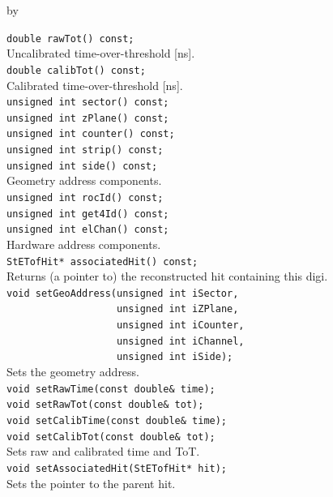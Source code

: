 \documentclass[twoside]{article}
\newcommand{\entrylabel}[1]{\mbox{\textbf{{#1}}}\hfil}%
\newenvironment{entry}
{\begin{list}{}%
    {\renewcommand{\makelabel}{\entrylabel}%
     \setlength{\labelwidth}{90pt}%
     \setlength{\leftmargin}{\labelwidth}
     \advance\leftmargin by \labelsep%
      }%
    }%
  {\end{list}}
\newcommand{\Entrylabel}[1]%
{\raisebox{0pt}[1ex][0pt]{\makebox[\labelwidth][l]%
    {\parbox[t]{\labelwidth}{\hspace{0pt}\textbf{{#1}}}}}}
\newenvironment{Entry}%
{\renewcommand{\entrylabel}{\Entrylabel}\begin{entry}}%
  {\end{entry}}
\begin{document}
\begin{Entry}
    \verb+double rawTot() const;+\\
    Uncalibrated time-over-threshold [ns].\\
    \verb+double calibTot() const;+\\
    Calibrated time-over-threshold [ns].\\
    \verb+unsigned int sector() const;+\\
    \verb+unsigned int zPlane() const;+\\
    \verb+unsigned int counter() const;+\\
    \verb+unsigned int strip() const;+\\
    \verb+unsigned int side() const;+\\
    Geometry address components.\\
    \verb+unsigned int rocId() const;+\\
    \verb+unsigned int get4Id() const;+\\
    \verb+unsigned int elChan() const;+\\
    Hardware address components.\\
    \verb+StETofHit* associatedHit() const;+\\
    Returns (a pointer to) the reconstructed hit containing this digi.\\
    \verb+void setGeoAddress(unsigned int iSector,+\\
    \verb+                   unsigned int iZPlane,+\\
    \verb+                   unsigned int iCounter,+\\
    \verb+                   unsigned int iChannel,+\\
    \verb+                   unsigned int iSide);+\\
    Sets the geometry address.\\
    \verb+void setRawTime(const double& time);+\\
    \verb+void setRawTot(const double& tot);+\\
    \verb+void setCalibTime(const double& time);+\\
    \verb+void setCalibTot(const double& tot);+\\
    Sets raw and calibrated time and ToT.\\
    \verb+void setAssociatedHit(StETofHit* hit);+\\
    Sets the pointer to the parent hit.\\
\end{Entry}
\clearpage

\end{document}
